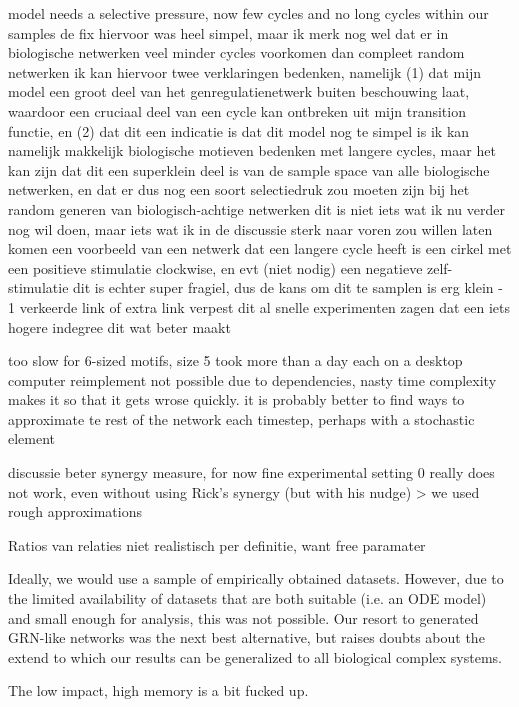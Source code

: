 \documentclass[../main.tex]{subfiles}
\begin{document}
model needs a selective pressure, now few cycles and no long cycles within our samples
de fix hiervoor was heel simpel, maar ik merk nog wel dat er in biologische netwerken veel minder cycles voorkomen dan compleet random netwerken
ik kan hiervoor twee verklaringen bedenken, namelijk (1) dat mijn model een groot deel van het genregulatienetwerk buiten beschouwing laat, waardoor een cruciaal deel van een cycle kan ontbreken uit mijn transition functie, en (2) dat dit een indicatie is dat dit model nog te simpel is
ik kan namelijk makkelijk biologische motieven bedenken met langere cycles, maar het kan zijn dat dit een superklein deel is van de sample space van alle biologische netwerken, en dat er dus nog een soort selectiedruk zou moeten zijn bij het random generen van biologisch-achtige netwerken
dit is niet iets wat ik nu verder nog wil doen, maar iets wat ik in de discussie sterk naar voren zou willen laten komen
een voorbeeld van een netwerk dat een langere cycle heeft is een cirkel met een positieve stimulatie clockwise, en evt (niet nodig) een negatieve zelf-stimulatie
dit is echter super fragiel, dus de kans om dit te samplen is erg klein - 1 verkeerde link of extra link verpest dit al
snelle experimenten zagen dat een iets hogere indegree dit wat beter maakt

too slow for 6-sized motifs, size 5 took more than a day each on a desktop computer
reimplement not possible due to dependencies, nasty time complexity makes it so that it gets wrose quickly.
it is probably better to find ways to approximate te rest of the network each timestep, perhaps with a stochastic element

discussie beter synergy measure, for now fine
experimental setting 0 really does not work, even without using Rick's synergy (but with his nudge) > we used rough approximations

Ratios van relaties niet realistisch per definitie, want free paramater

Ideally, we would use a sample of empirically obtained datasets.
However, due to the limited availability of datasets that are both suitable (i.e. an ODE model) and small enough for analysis, this was not possible.
Our resort to generated GRN-like networks was the next best alternative, but raises doubts about the extend to which our results can be generalized to all biological complex systems.

The low impact, high memory is a bit fucked up. %
\end{document}
